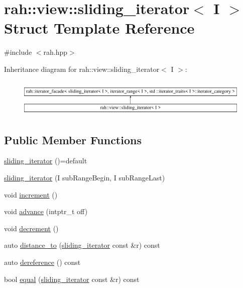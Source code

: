 \hypertarget{structrah_1_1view_1_1sliding__iterator}{}\section{rah\+::view\+::sliding\+\_\+iterator$<$ I $>$ Struct Template Reference}
\label{structrah_1_1view_1_1sliding__iterator}


{\ttfamily \#include $<$rah.\+hpp$>$}

Inheritance diagram for rah\+::view\+::sliding\+\_\+iterator$<$ I $>$\+:\begin{figure}[H]
\begin{center}
\leavevmode
\includegraphics[height=1.803543cm]{structrah_1_1view_1_1sliding__iterator}
\end{center}
\end{figure}
\subsection*{Public Member Functions}
\begin{DoxyCompactItemize}
\item 
\mbox{\hyperlink{structrah_1_1view_1_1sliding__iterator_aca6d86f12e1a03d9d4a803538099bf4a}{sliding\+\_\+iterator}} ()=default
\item 
\mbox{\hyperlink{structrah_1_1view_1_1sliding__iterator_a4d2432f2b502f31dce283f11044f3999}{sliding\+\_\+iterator}} (I sub\+Range\+Begin, I sub\+Range\+Last)
\item 
void \mbox{\hyperlink{structrah_1_1view_1_1sliding__iterator_afdcdf089bd37ce5238260254d4232cf3}{increment}} ()
\item 
void \mbox{\hyperlink{structrah_1_1view_1_1sliding__iterator_a5a26e1f5ef1cdf607f4f25668f929bf2}{advance}} (intptr\+\_\+t off)
\item 
void \mbox{\hyperlink{structrah_1_1view_1_1sliding__iterator_a51d7291b82f8319983ba71318fce02c8}{decrement}} ()
\item 
auto \mbox{\hyperlink{structrah_1_1view_1_1sliding__iterator_a39b05ab81dcf63fcad30effc793b42dd}{distance\+\_\+to}} (\mbox{\hyperlink{structrah_1_1view_1_1sliding__iterator}{sliding\+\_\+iterator}} const \&r) const
\item 
auto \mbox{\hyperlink{structrah_1_1view_1_1sliding__iterator_a1a3c2cc7b17879f3745797de3b933ed4}{dereference}} () const
\item 
bool \mbox{\hyperlink{structrah_1_1view_1_1sliding__iterator_aa4038c8a36376ac727553e98bf4afb24}{equal}} (\mbox{\hyperlink{structrah_1_1view_1_1sliding__iterator}{sliding\+\_\+iterator}} const \&r) const
\end{DoxyCompactItemize}
